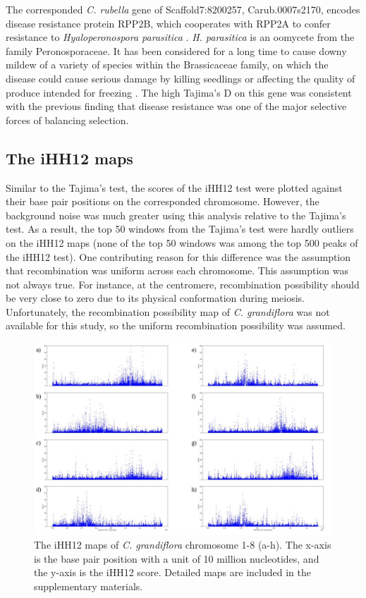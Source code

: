 The corresponded \emph{C. rubella} gene of Scaffold7:8200257, Carub.0007s2170, encodes disease resistance protein RPP2B, which cooperates with RPP2A to confer resistance to \emph{Hyaloperonospora parasitica} \citep{RN18}. \emph{H. parasitica} is an oomycete from the family Peronosporaceae. It has been considered for a long time to cause downy mildew of a variety of species within the Brassicaceae family, on which the disease could cause serious damage by killing seedlings or affecting the quality of produce intended for freezing \citep{RN18}. The high Tajima’s D on this gene was consistent with the previous finding that disease resistance was one of the major selective forces of balancing selection.

\subsection{The iHH12 maps}
Similar to the Tajima’s test, the scores of the iHH12 test \citep{RN16} were plotted against their base pair positions on the corresponded chromosome. However, the background noise was much greater using this analysis relative to the Tajima’s test. As a result, the top 50 windows from the Tajima’s test were hardly outliers on the iHH12 maps (none of the top 50 windows was among the top 500 peaks of the iHH12 test). One contributing reason for this difference was the assumption that recombination was uniform across each chromosome. This assumption was not always true. For instance, at the centromere, recombination possibility should be very close to zero due to its physical conformation during meiosis. Unfortunately, the recombination possibility map of \emph{C. grandiflora} was not available for this study, so the uniform recombination possibility was assumed.

\begin{figure}[h!]
    \centering
    \includegraphics[scale=0.7]{figs/2.JPG}
    \caption{The iHH12 maps of \emph{C. grandiflora} chromosome 1-8 (a-h). The x-axis is the base pair position with a unit of 10 million nucleotides, and the y-axis is the iHH12 score. Detailed maps are included in the supplementary materials.}
    \label{fig:3}
\end{figure}

